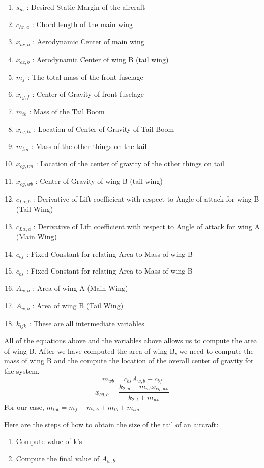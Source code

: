 \begin{enumerate}
\item $s_{m}$ : Desired Static Margin of the aircraft
\item $c_{hr,a}$ : Chord length of the main wing
\item $x_{ac,a}$ : Aerodynamic Center of main wing
\item $x_{ac,b}$ : Aerodynamic Center of wing B (tail wing)
\item $m_{f}$ : The total mass of the front fuselage
\item $x_{cg,f}$ : Center of Gravity of front fuselage
\item $m_{tb}$ : Mass of the Tail Boom
\item $x_{cg,tb}$ : Location of Center of Gravity of Tail Boom
\item $m_{tm}$ : Mass of the other things on the tail
\item $x_{cg,tm}$ : Location of the center of gravity of the other things on tail
\item $x_{cg,wb}$ : Center of Gravity of wing B (tail wing)
\item $c_{L\alpha,b}$ : Derivative of Lift coefficient with respect to Angle of attack for wing B (Tail Wing)
\item $c_{L\alpha,a}$ : Derivative of Lift coefficient with respect to Angle of attack for wing A (Main Wing)
\item $c_{bf}$ : Fixed Constant for relating Area to Mass of wing B
\item $c_{bs}$ : Fixed Constant for relating Area to Mass of wing B
\item $A_{w,a}$ : Area of wing A (Main Wing)
\item $A_{w,b}$ : Area of wing B (Tail Wing)
\item $k_{ijk}$ : These are all intermediate variables
\end{enumerate}
All of the equations above and the variables above allows us to compute the area of wing B. After we have computed the area of wing B, we need to compute the mass of wing B and the compute the location of the overall center of gravity for the system.
$$m_{wb} = c_{bs}A_{w,b} + c_{bf}$$
$$x_{cg,o} = \frac{ k_{2,u} + m_{wb}x_{cg,wb}}{k_{2,l} + m_{wb}}$$
For our case, $m_{tot} = m_{f} + m_{wb} + m_{tb} + m_{tm}$


Here are the steps of how to obtain the size of the tail of an aircraft:
\begin{enumerate}
\item Compute value of k's
\item Compute the final value of $A_{w,b}$
\end{enumerate}


